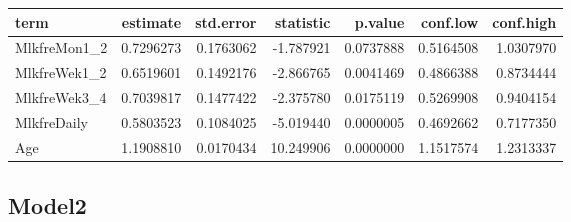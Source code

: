 \documentclass[
]{article}
\newenvironment{Shaded}{\begin{snugshade}}{\end{snugshade}}
\newcommand{\DataTypeTok}[1]{\textcolor[rgb]{0.13,0.29,0.53}{#1}}
\newcommand{\KeywordTok}[1]{\textcolor[rgb]{0.13,0.29,0.53}{\textbf{#1}}}
\newcommand{\NormalTok}[1]{#1}
\newcommand{\OperatorTok}[1]{\textcolor[rgb]{0.81,0.36,0.00}{\textbf{#1}}}
\newcommand{\OtherTok}[1]{\textcolor[rgb]{0.56,0.35,0.01}{#1}}
\newcommand{\StringTok}[1]{\textcolor[rgb]{0.31,0.60,0.02}{#1}}
\begin{document}
\begin{longtable}[]{@{}lrrrrrr@{}}
\toprule
term & estimate & std.error & statistic & p.value & conf.low &
conf.high\tabularnewline
\midrule
\endhead
MlkfreMon1\_2 & 0.7296273 & 0.1763062 & -1.787921 & 0.0737888 &
0.5164508 & 1.0307970\tabularnewline
MlkfreWek1\_2 & 0.6519601 & 0.1492176 & -2.866765 & 0.0041469 &
0.4866388 & 0.8734444\tabularnewline
MlkfreWek3\_4 & 0.7039817 & 0.1477422 & -2.375780 & 0.0175119 &
0.5269908 & 0.9404154\tabularnewline
MlkfreDaily & 0.5803523 & 0.1084025 & -5.019440 & 0.0000005 & 0.4692662
& 0.7177350\tabularnewline
Age & 1.1908810 & 0.0170434 & 10.249906 & 0.0000000 & 1.1517574 &
1.2313337\tabularnewline
\bottomrule
\end{longtable}

\hypertarget{model2-5}{%
\subsection{Model2}\label{model2-5}}

\begin{Shaded}
\end{Shaded}
\end{document}
